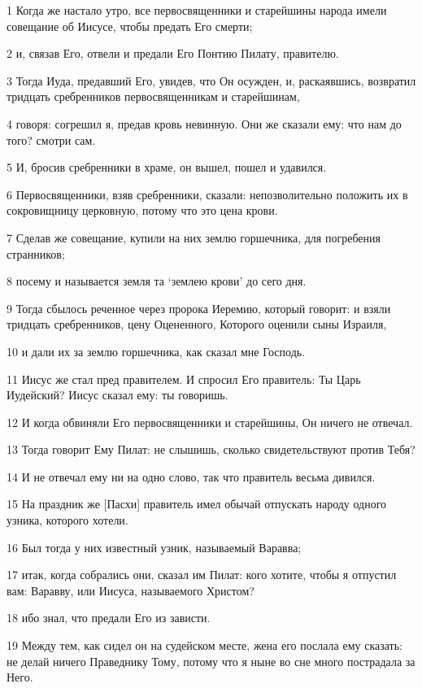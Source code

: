 \par 1 Когда же настало утро, все первосвященники и старейшины народа имели совещание об Иисусе, чтобы предать Его смерти;
\par 2 и, связав Его, отвели и предали Его Понтию Пилату, правителю.
\par 3 Тогда Иуда, предавший Его, увидев, что Он осужден, и, раскаявшись, возвратил тридцать сребренников первосвященникам и старейшинам,
\par 4 говоря: согрешил я, предав кровь невинную. Они же сказали ему: что нам до того? смотри сам.
\par 5 И, бросив сребренники в храме, он вышел, пошел и удавился.
\par 6 Первосвященники, взяв сребренники, сказали: непозволительно положить их в сокровищницу церковную, потому что это цена крови.
\par 7 Сделав же совещание, купили на них землю горшечника, для погребения странников;
\par 8 посему и называется земля та `землею крови' до сего дня.
\par 9 Тогда сбылось реченное через пророка Иеремию, который говорит: и взяли тридцать сребренников, цену Оцененного, Которого оценили сыны Израиля,
\par 10 и дали их за землю горшечника, как сказал мне Господь.
\par 11 Иисус же стал пред правителем. И спросил Его правитель: Ты Царь Иудейский? Иисус сказал ему: ты говоришь.
\par 12 И когда обвиняли Его первосвященники и старейшины, Он ничего не отвечал.
\par 13 Тогда говорит Ему Пилат: не слышишь, сколько свидетельствуют против Тебя?
\par 14 И не отвечал ему ни на одно слово, так что правитель весьма дивился.
\par 15 На праздник же [Пасхи] правитель имел обычай отпускать народу одного узника, которого хотели.
\par 16 Был тогда у них известный узник, называемый Варавва;
\par 17 итак, когда собрались они, сказал им Пилат: кого хотите, чтобы я отпустил вам: Варавву, или Иисуса, называемого Христом?
\par 18 ибо знал, что предали Его из зависти.
\par 19 Между тем, как сидел он на судейском месте, жена его послала ему сказать: не делай ничего Праведнику Тому, потому что я ныне во сне много пострадала за Него.

